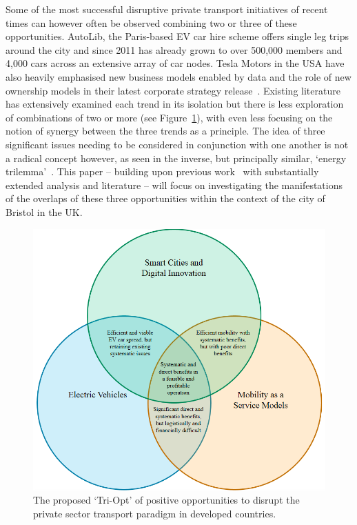 \documentclass[b5paper,10pt]{article}
\begin{document}
Some of the most successful disruptive private transport initiatives
of recent times can however often be observed combining two or three
of these opportunities. AutoLib, the Paris-based EV car hire scheme
offers single leg trips around the city and since 2011 has already
grown to over 500,000 members and 4,000 cars across an extensive array
of car nodes. Tesla Motors in the USA have also heavily emphasised new
business models enabled by data and the role of new ownership models
in their latest corporate strategy release~\citep{musk:2016}. Existing
literature has extensively examined each trend in its isolation but
there is less exploration of combinations of two or more (see
Figure~\ref{fig:triopt}), with even less focusing on the notion of
synergy between the three trends as a principle. The idea of three
significant issues needing to be considered in conjunction with one
another is not a radical concept however, as seen in the inverse, but
principally similar, `energy trilemma'~\citep{wec:2015}. This paper --
building upon previous work~\citep{cooper-et-al-sose:2015} with
substantially extended analysis and literature -- will focus on
investigating the manifestations of the overlaps of these three
opportunities within the context of the city of Bristol in the UK.

\begin{figure}[htb]
\centering
\includegraphics[width=0.6\columnwidth]{images/triopt.png}
\caption{The proposed `Tri-Opt' of positive opportunities to disrupt
  the private sector transport paradigm in developed countries.}
\label{fig:triopt}
\end{figure}

\end{document}
